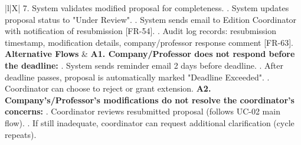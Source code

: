 \begin{xltabular}{\textwidth}{|l|X|}
        7. System validates modified proposal for completeness. . System updates proposal status to "Under Review". . System sends email to Edition Coordinator with notification of resubmission [FR-54]. . Audit log records: resubmission timestamp, modification details, company/professor response comment [FR-63]. \\ \hline
    \textbf{Alternative Flows} &
        \textbf{A1. Company/Professor does not respond before the deadline:} . System sends reminder email 2 days before deadline. . After deadline passes, proposal is automatically marked "Deadline Exceeded". . Coordinator can choose to reject or grant extension. \newline
        \textbf{A2. Company's/Professor's modifications do not resolve the coordinator's concerns:} . Coordinator reviews resubmitted proposal (follows UC-02 main flow). . If still inadequate, coordinator can request additional clarification (cycle repeats). \\ \hline
\end{xltabular}


